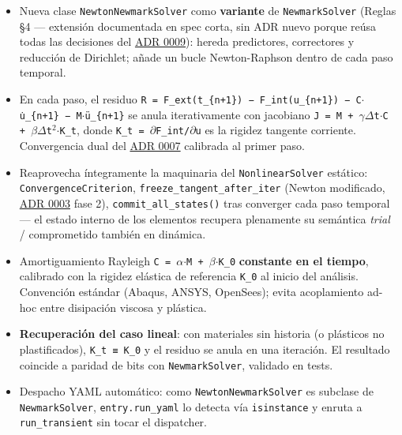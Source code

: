 \documentclass[11pt,oneside]{report}
\begin{document}
\begin{itemize}
  \item Nueva clase \texttt{NewtonNewmarkSolver} como \textbf{variante} de \texttt{NewmarkSolver} (Reglas §4 --- extensión documentada en spec corta, sin ADR nuevo porque reúsa todas las decisiones del \hyperref[adr:0009]{ADR 0009}): hereda predictores, correctores y reducción de Dirichlet; añade un bucle Newton-Raphson dentro de cada paso temporal.
  \item En cada paso, el residuo \texttt{R = F\_\allowbreak{}ext(t\_\allowbreak{}\{n+1\}) − F\_\allowbreak{}int(u\_\allowbreak{}\{n+1\}) − C\ensuremath{\cdot}u̇\_\allowbreak{}\{n+1\} − M\ensuremath{\cdot}ü\_\allowbreak{}\{n+1\}} se anula iterativamente con jacobiano \texttt{J = M + \ensuremath{\gamma}\ensuremath{\Delta}t\ensuremath{\cdot}C + \ensuremath{\beta}\ensuremath{\Delta}t\ensuremath{^{2}}\ensuremath{\cdot}K\_\allowbreak{}t}, donde \texttt{K\_t = \ensuremath{\partial}F\_int/\ensuremath{\partial}u} es la rigidez tangente corriente. Convergencia dual del \hyperref[adr:0007]{ADR 0007} calibrada al primer paso.
  \item Reaprovecha íntegramente la maquinaria del \texttt{NonlinearSolver} estático: \texttt{ConvergenceCriterion}, \texttt{freeze\_\allowbreak{}tangent\_\allowbreak{}after\_\allowbreak{}iter} (Newton modificado, \hyperref[adr:0003]{ADR 0003} fase 2), \texttt{commit\_\allowbreak{}all\_\allowbreak{}states()} tras converger cada paso temporal --- el estado interno de los elementos recupera plenamente su semántica \textit{trial} / comprometido también en dinámica.
  \item Amortiguamiento Rayleigh \texttt{C = \ensuremath{\alpha}\ensuremath{\cdot}M + \ensuremath{\beta}\ensuremath{\cdot}K\_0} \textbf{constante en el tiempo}, calibrado con la rigidez elástica de referencia \texttt{K\_0} al inicio del análisis. Convención estándar (Abaqus, ANSYS, OpenSees); evita acoplamiento ad-hoc entre disipación viscosa y plástica.
  \item \textbf{Recuperación del caso lineal}: con materiales sin historia (o plásticos no plastificados), \texttt{K\_t ≡ K\_0} y el residuo se anula en una iteración. El resultado coincide a paridad de bits con \texttt{NewmarkSolver}, validado en tests.
  \item Despacho YAML automático: como \texttt{NewtonNewmarkSolver} es subclase de \texttt{NewmarkSolver}, \texttt{entry.run\_yaml} lo detecta vía \texttt{isinstance} y enruta a \texttt{run\_transient} sin tocar el dispatcher.
\end{itemize}
\end{document}
